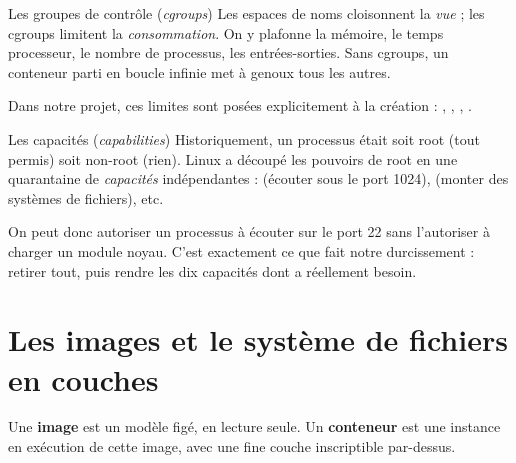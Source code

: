 \begin{notion}{Les groupes de contrôle (\emph{cgroups})}
Les espaces de noms cloisonnent la \emph{vue} ; les cgroups limitent la
\emph{consommation}. On y plafonne la mémoire, le temps processeur, le nombre
de processus, les entrées-sorties. Sans cgroups, un conteneur parti en boucle
infinie met à genoux tous les autres.

Dans notre projet, ces limites sont posées explicitement à la création :
, , , .
\end{notion}

\begin{notion}{Les capacités (\emph{capabilities})}
Historiquement, un processus était soit root (tout permis) soit non-root (rien).
Linux a découpé les pouvoirs de root en une quarantaine de \emph{capacités}
indépendantes :  (écouter sous le port 1024),
 (monter des systèmes de fichiers), etc.

On peut donc autoriser un processus à écouter sur le port 22 sans l'autoriser
à charger un module noyau. C'est exactement ce que fait notre durcissement :
retirer tout, puis rendre les dix capacités dont  a réellement
besoin.
\end{notion}

\section{Les images et le système de fichiers en couches}

Une \textbf{image} est un modèle figé, en lecture seule. Un \textbf{conteneur}
est une instance en exécution de cette image, avec une fine couche
inscriptible par-dessus.

